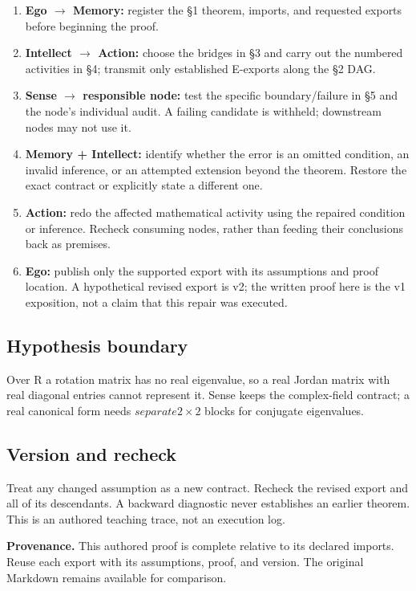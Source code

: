 \documentclass[preprint,12pt,aps,pra,showkeys,amsmath,amssymb,superscriptaddress,floatfix]{revtex4-2}
\theoremstyle{definition}
\theoremstyle{remark}
\providecommand{\tightlist}{\setlength{\itemsep}{2pt}\setlength{\parskip}{0pt}}
\begin{document}
\begin{enumerate}
\def\labelenumi{\arabic{enumi}.}
\tightlist
\item
  \textbf{Ego \(\to\) Memory:} register the §1 theorem, imports, and
  requested exports before beginning the proof.
\item
  \textbf{Intellect \(\to\) Action:} choose the bridges in §3 and carry
  out the numbered activities in §4; transmit only established E-exports
  along the §2 DAG.
\item
  \textbf{Sense \(\to\) responsible node:} test the specific
  boundary/failure in §5 and the node's individual audit. A failing
  candidate is withheld; downstream nodes may not use it.
\item
  \textbf{Memory + Intellect:} identify whether the error is an omitted
  condition, an invalid inference, or an attempted extension beyond the
  theorem. Restore the exact contract or explicitly state a different
  one.
\item
  \textbf{Action:} redo the affected mathematical activity using the
  repaired condition or inference. Recheck consuming nodes, rather than
  feeding their conclusions back as premises.
\item
  \textbf{Ego:} publish only the supported export with its assumptions
  and proof location. A hypothetical revised export is v2; the written
  proof here is the v1 exposition, not a claim that this repair was
  executed.
\end{enumerate}

\subsection{Hypothesis boundary}
Over R a rotation matrix has no real eigenvalue, so a real Jordan matrix
with real diagonal entries cannot represent it. Sense keeps the
complex-field contract; a real canonical form needs
\(separate2\times 2\) blocks for conjugate eigenvalues.

\subsection{Version and recheck}
Treat any changed assumption as a new contract. Recheck the revised
export and all of its descendants. A backward diagnostic never
establishes an earlier theorem. This is an authored teaching trace, not
an execution log.

\par\medskip\begingroup\small\linespread{1.0}\selectfont\noindent\textbf{Provenance.} This authored proof is complete relative to its declared imports. Reuse
each export with its assumptions, proof, and version. The original
Markdown remains available for comparison.
\par\endgroup
\end{document}
